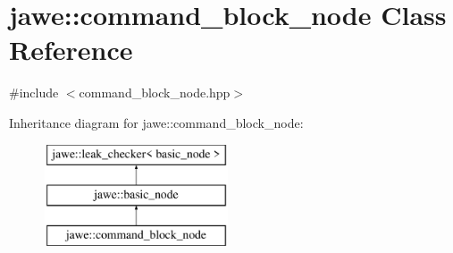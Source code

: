 \hypertarget{classjawe_1_1command__block__node}{}\section{jawe\+:\+:command\+\_\+block\+\_\+node Class Reference}
\label{classjawe_1_1command__block__node}


{\ttfamily \#include $<$command\+\_\+block\+\_\+node.\+hpp$>$}

Inheritance diagram for jawe\+:\+:command\+\_\+block\+\_\+node\+:\begin{figure}[H]
\begin{center}
\leavevmode
\includegraphics[height=3.000000cm]{classjawe_1_1command__block__node}
\end{center}
\end{figure}
